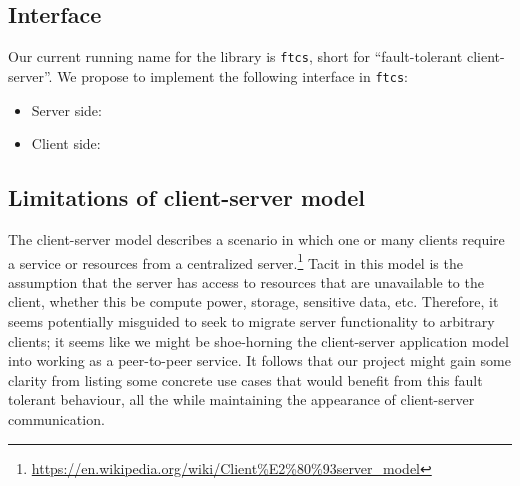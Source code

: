 \subsection{Interface}

Our current running name for the library is \texttt{ftcs}, short for ``fault-tolerant client-server''. We propose to implement the following interface in \texttt{ftcs}:

\begin{itemize}
	\item Server side:
    \begin{itemize}
    \end{itemize}
    \item Client side:
    	\begin{itemize}
    	\end{itemize}
\end{itemize}

\subsection{Limitations of client-server model}

The client-server model describes a scenario in which one or many clients require a service or resources from a centralized server.\footnote{\url{https://en.wikipedia.org/wiki/Client\%E2\%80\%93server\_model}} Tacit in this model is the assumption that the server has access to resources that are unavailable to the client, whether this be compute power, storage, sensitive data, etc. Therefore, it seems potentially misguided to seek to migrate server functionality to arbitrary clients; it seems like we might be shoe-horning the client-server application model into working as a peer-to-peer service. It follows that our project might gain some clarity from listing some concrete use cases that would benefit from this fault tolerant behaviour, all the while maintaining the appearance of client-server communication. 

